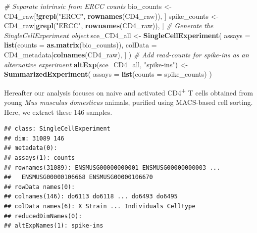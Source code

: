\documentclass[9pt,a4paper,]{extarticle}
\newenvironment{Shaded}{\begin{snugshade}}{\end{snugshade}}
\newcommand{\CommentTok}[1]{\textcolor[rgb]{0.56,0.35,0.01}{\textit{#1}}}
\newcommand{\DataTypeTok}[1]{\textcolor[rgb]{0.13,0.29,0.53}{#1}}
\newcommand{\KeywordTok}[1]{\textcolor[rgb]{0.13,0.29,0.53}{\textbf{#1}}}
\newcommand{\NormalTok}[1]{#1}
\newcommand{\OperatorTok}[1]{\textcolor[rgb]{0.81,0.36,0.00}{\textbf{#1}}}
\newcommand{\StringTok}[1]{\textcolor[rgb]{0.31,0.60,0.02}{#1}}
\begin{document}
\begin{Shaded}
\begin{Highlighting}[]
\CommentTok{# Separate intrinsic from ERCC counts}
\NormalTok{bio_counts <-}\StringTok{ }\NormalTok{CD4_raw[}\OperatorTok{!}\KeywordTok{grepl}\NormalTok{(}\StringTok{"ERCC"}\NormalTok{, }\KeywordTok{rownames}\NormalTok{(CD4_raw)), ]}
\NormalTok{spike_counts <-}\StringTok{ }\NormalTok{CD4_raw[}\KeywordTok{grepl}\NormalTok{(}\StringTok{"ERCC"}\NormalTok{, }\KeywordTok{rownames}\NormalTok{(CD4_raw)), ]}
\CommentTok{# Generate the SingleCellExperiment object}
\NormalTok{sce_CD4_all <-}\StringTok{ }\KeywordTok{SingleCellExperiment}\NormalTok{(}
  \DataTypeTok{assays =} \KeywordTok{list}\NormalTok{(}\DataTypeTok{counts =} \KeywordTok{as.matrix}\NormalTok{(bio_counts)),}
  \DataTypeTok{colData =}\NormalTok{ CD4_metadata[}\KeywordTok{colnames}\NormalTok{(CD4_raw), ]}
\NormalTok{)}
\CommentTok{# Add read-counts for spike-ins as an alternative experiment}
\KeywordTok{altExp}\NormalTok{(sce_CD4_all, }\StringTok{"spike-ins"}\NormalTok{) <-}\StringTok{ }\KeywordTok{SummarizedExperiment}\NormalTok{(}
  \DataTypeTok{assays =} \KeywordTok{list}\NormalTok{(}\DataTypeTok{counts =}\NormalTok{ spike_counts)}
\NormalTok{)}
\end{Highlighting}
\end{Shaded}

Hereafter our analysis focuses on naive and activated CD4\textsuperscript{+} T cells obtained
from young \emph{Mus musculus domesticus} animals, purified using MACS-based cell sorting.
Here, we extract these
146 samples.

\begin{Shaded}
\end{Shaded}

\begin{verbatim}
## class: SingleCellExperiment 
## dim: 31089 146 
## metadata(0):
## assays(1): counts
## rownames(31089): ENSMUSG00000000001 ENSMUSG00000000003 ...
##   ENSMUSG00000106668 ENSMUSG00000106670
## rowData names(0):
## colnames(146): do6113 do6118 ... do6493 do6495
## colData names(6): X Strain ... Individuals Celltype
## reducedDimNames(0):
## altExpNames(1): spike-ins
\end{verbatim}
\end{document}
